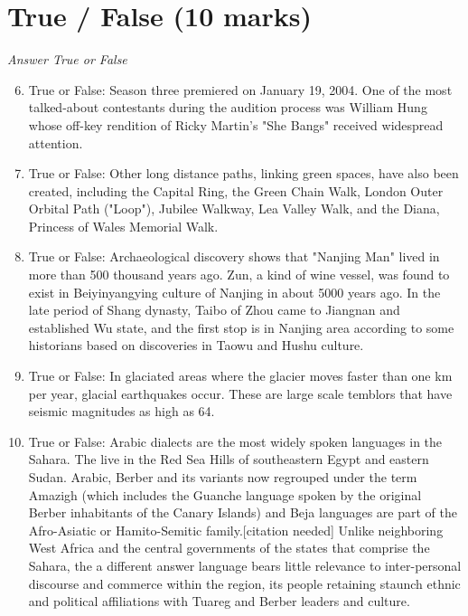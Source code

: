 \documentclass[12pt]{article}
\begin{document}
\section*{True / False (10 marks)}
\textit{Answer True or False}
\begin{enumerate}[label=\arabic*.]
\setcounter{enumi}{5}
\item True or False: Season three premiered on January 19, 2004. One of the most talked-about contestants during the audition process was William Hung whose off-key rendition of Ricky Martin's "She Bangs" received widespread attention.
\item True or False: Other long distance paths, linking green spaces, have also been created, including the Capital Ring, the Green Chain Walk, London Outer Orbital Path ("Loop"), Jubilee Walkway, Lea Valley Walk, and the Diana, Princess of Wales Memorial Walk.
\item True or False: Archaeological discovery shows that "Nanjing Man" lived in more than 500 thousand years ago. Zun, a kind of wine vessel, was found to exist in Beiyinyangying culture of Nanjing in about 5000 years ago. In the late period of Shang dynasty, Taibo of Zhou came to Jiangnan and established Wu state, and the first stop is in Nanjing area according to some historians based on discoveries in Taowu and Hushu culture.
\item True or False: In glaciated areas where the glacier moves faster than one km per year, glacial earthquakes occur. These are large scale temblors that have seismic magnitudes as high as 64.
\item True or False: Arabic dialects are the most widely spoken languages in the Sahara. The live in the Red Sea Hills of southeastern Egypt and eastern Sudan. Arabic, Berber and its variants now regrouped under the term Amazigh (which includes the Guanche language spoken by the original Berber inhabitants of the Canary Islands) and Beja languages are part of the Afro-Asiatic or Hamito-Semitic family.[citation needed] Unlike neighboring West Africa and the central governments of the states that comprise the Sahara, the a different answer language bears little relevance to inter-personal discourse and commerce within the region, its people retaining staunch ethnic and political affiliations with Tuareg and Berber leaders and culture.
\end{enumerate}
\end{document}

